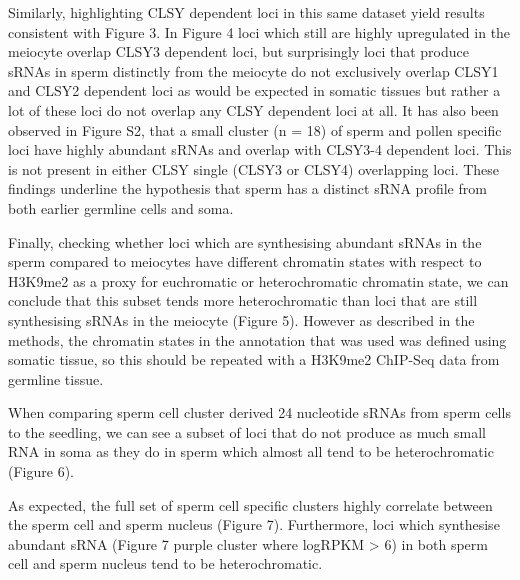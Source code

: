 Similarly, highlighting CLSY dependent loci in this same dataset yield results consistent with Figure 3. In Figure 4 loci which still are highly upregulated in the meiocyte overlap CLSY3 dependent loci, but surprisingly loci that produce sRNAs in sperm distinctly from the meiocyte do not exclusively overlap CLSY1 and CLSY2 dependent loci as would be expected in somatic tissues but rather a lot of these loci do not overlap any CLSY dependent loci at all. It has also been observed in Figure S2, that a small cluster (n = 18) of sperm and pollen specific loci have highly abundant sRNAs and overlap with CLSY3-4 dependent loci. This is not present in either CLSY single (CLSY3 or CLSY4) overlapping loci. These findings underline the hypothesis that sperm has a distinct sRNA profile from both earlier germline cells and soma.

Finally, checking whether loci which are synthesising abundant sRNAs in the sperm compared to meiocytes have different chromatin states with respect to H3K9me2 as a proxy for euchromatic or heterochromatic chromatin state, we can conclude that this subset tends more heterochromatic than loci that are still synthesising sRNAs in the meiocyte (Figure 5). However as described in the methods, the chromatin states in the annotation that was used was defined using somatic tissue, so this should be repeated with a H3K9me2 ChIP-Seq data from germline tissue.
 
When comparing sperm cell cluster derived 24 nucleotide sRNAs from sperm cells to the seedling, we can see a subset of loci that do not produce as much small RNA in soma as they do in sperm which almost all tend to be heterochromatic (Figure 6).

As expected, the full set of sperm cell specific clusters highly correlate between the sperm cell and sperm nucleus (Figure 7). Furthermore, loci which synthesise abundant sRNA (Figure 7 purple cluster where logRPKM > 6) in both sperm cell and sperm nucleus tend to be heterochromatic. 

